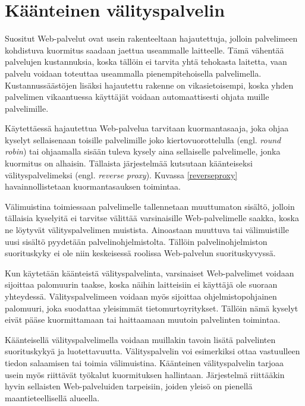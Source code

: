 \section{Käänteinen välityspalvelin}
\label{valimuisti}

Suositut Web-palvelut ovat usein rakenteeltaan hajautettuja, jolloin
palvelimeen kohdistuva kuormitus saadaan jaettua useammalle
laitteelle. Tämä vähentää palvelujen kustannuksia, koska tällöin ei
tarvita yhtä tehokasta laitetta, vaan palvelu voidaan toteuttaa
useammalla pienempitehoisella palvelimella. Kustannussäästöjen lisäksi
hajautettu rakenne on vikasietoisempi, koska yhden palvelimen
vikaantuessa käyttäjät voidaan automaattisesti ohjata muille
palvelimille.

Käytettäessä hajautettua Web-palvelua tarvitaan kuormantasaaja,
joka ohjaa kyselyt sellaisenaan toisille palvelimille joko
kiertovuorottelulla (engl. \textit{round robin}) tai ohjaamalla sisään
tuleva kysely aina sellaiselle palvelimelle, jonka kuormitus on
alhaisin. Tällaista järjestelmää kutsutaan käänteiseksi
välityspalvelimeksi (engl. \textit{reverse proxy}). Kuvassa
\ref{reverseproxy} havainnollistetaan kuormantasauksen toimintaa.

Välimuistina toimiessaan palvelimelle tallennetaan muuttumaton
sisältö, jolloin tällaisia kyselyitä ei tarvitse välittää
varsinaisille Web-palvelimelle saakka, koska ne löytyvät
välityspalvelimen muistista. Ainoastaan muuttuva tai välimuistille
uusi sisältö pyydetään palvelinohjelmistolta. Tällöin
palvelinohjelmiston suorituskyky ei ole niin keskeisessä roolissa
Web-palvelun suorituskyvyssä.

Kun käytetään käänteistä välityspalvelinta, varsinaiset
Web-palvelimet voidaan sijoittaa palomuurin taakse, koska näihin laitteisiin
ei käyttäjä ole suoraan yhteydessä. Välityspalvelimeen voidaan myös
sijoittaa ohjelmistopohjainen palomuuri, joka suodattaa yleisimmät
tietomurtoyritykset. Tällöin nämä kyselyt eivät pääse
kuormittamaan tai haittaamaan muutoin palvelinten toimintaa.

Käänteisellä välityspalvelimella voidaan muillakin tavoin lisätä
palvelinten suorituskykyä ja luotettavuutta. Välityspalvelin voi
esimerkiksi ottaa vastuulleen tiedon salaamisen tai toimia
välimuistina. Käänteinen välityspalvelin tarjoaa usein myös riittävät työkalut 
kuormituksen hallintaan. Järjestelmä riittääkin hyvin sellaisten Web-palveluiden
tarpeisiin, joiden yleisö on pienellä maantieteellisellä alueella.

